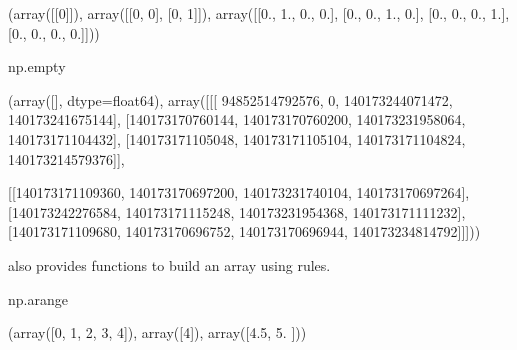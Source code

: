 \documentclass[letterpaper,10pt,english]{sphinxmanual}
\begin{document}
\begin{sphinxVerbatim}[commandchars=\\\{\}]
(array([[0]]),
 array([[0, 0],
        [0, 1]]),
 array([[0., 1., 0., 0.],
        [0., 0., 1., 0.],
        [0., 0., 0., 1.],
        [0., 0., 0., 0.]]))
\end{sphinxVerbatim}

\begin{sphinxVerbatim}[commandchars=\\\{\}]
np.empty
    
\end{sphinxVerbatim}

\begin{sphinxVerbatim}[commandchars=\\\{\}]
(array([], dtype=float64),
 array([[[ 94852514792576,               0, 140173244071472,
          140173241675144],
         [140173170760144, 140173170760200, 140173231958064,
          140173171104432],
         [140173171105048, 140173171105104, 140173171104824,
          140173214579376]],
 
        [[140173171109360, 140173170697200, 140173231740104,
          140173170697264],
         [140173242276584, 140173171115248, 140173231954368,
          140173171111232],
         [140173171109680, 140173170696752, 140173170696944,
          140173234814792]]]))
\end{sphinxVerbatim}

 also provides functions to build an array using rules.

\begin{sphinxVerbatim}[commandchars=\\\{\}]
np.arange
    
\end{sphinxVerbatim}

\begin{sphinxVerbatim}[commandchars=\\\{\}]
(array([0, 1, 2, 3, 4]), array([4]), array([4.5, 5. ]))
\end{sphinxVerbatim}
\end{document}
